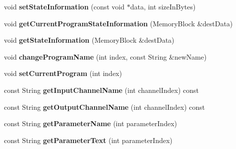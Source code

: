 \begin{DoxyCompactItemize}
\item 
\hypertarget{classGenericProcessor_ab405c546f5403871bf1855294a7cd0ff}{void {\bfseries set\-State\-Information} (const void $\ast$data, int size\-In\-Bytes)}\label{classGenericProcessor_ab405c546f5403871bf1855294a7cd0ff}

\item 
\hypertarget{classGenericProcessor_a472e86370ddb3adc0bb45aea1cca6dc0}{void {\bfseries get\-Current\-Program\-State\-Information} (Memory\-Block \&dest\-Data)}\label{classGenericProcessor_a472e86370ddb3adc0bb45aea1cca6dc0}

\item 
\hypertarget{classGenericProcessor_a042fc5bbfe1d25cc70b605fa7b591666}{void {\bfseries get\-State\-Information} (Memory\-Block \&dest\-Data)}\label{classGenericProcessor_a042fc5bbfe1d25cc70b605fa7b591666}

\item 
\hypertarget{classGenericProcessor_acf6b9ccfb9be861035dbb919d8fcc290}{void {\bfseries change\-Program\-Name} (int index, const String \&new\-Name)}\label{classGenericProcessor_acf6b9ccfb9be861035dbb919d8fcc290}

\item 
\hypertarget{classGenericProcessor_ac8949ad0240cb8f5167da076d1fc287b}{void {\bfseries set\-Current\-Program} (int index)}\label{classGenericProcessor_ac8949ad0240cb8f5167da076d1fc287b}

\item 
\hypertarget{classGenericProcessor_acc50df9e1f4d532070c4cf93f73c3766}{const String {\bfseries get\-Input\-Channel\-Name} (int channel\-Index) const }\label{classGenericProcessor_acc50df9e1f4d532070c4cf93f73c3766}

\item 
\hypertarget{classGenericProcessor_a58d462c3907932f6beed365b959b9e0e}{const String {\bfseries get\-Output\-Channel\-Name} (int channel\-Index) const }\label{classGenericProcessor_a58d462c3907932f6beed365b959b9e0e}

\item 
\hypertarget{classGenericProcessor_a353b144b431efafb2b830b1ff759c808}{const String {\bfseries get\-Parameter\-Name} (int parameter\-Index)}\label{classGenericProcessor_a353b144b431efafb2b830b1ff759c808}

\item 
\hypertarget{classGenericProcessor_abcfc1c5ffe90cb744e455d287e6059a6}{const String {\bfseries get\-Parameter\-Text} (int parameter\-Index)}\label{classGenericProcessor_abcfc1c5ffe90cb744e455d287e6059a6}


\end{DoxyCompactItemize}
